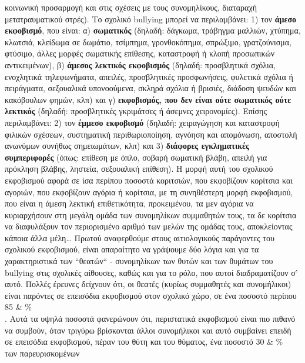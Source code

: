 \documentclass[12pt,a4paper]{book}
\begin{document}
κοινωνική προσαρμογή και στις σχέσεις με τους συνομηλίκους, διαταραχή
μετατραυματικού στρές).
\newline\setlength{\parindent}{20pt}\indent Το σχολικό bullying μπορεί να
περιλαμβάνει: 1) τον \textbf{άμεσο εκφοβισμό}, που είναι: α) \textbf{σωματικός}
(δηλαδή: δάγκωμα, τράβηγμα μαλλιών, χτύπημα, κλωτσιά, κλείδωμα σε δωμάτιο,
τσίμπημα, γρονθοκόπημα, σπρώξιμο, γρατζούνισμα, φτύσιμο, άλλες μορφές σωματικής
επίθεσης, καταστροφή ή κλοπή προσωπικών αντικειμένων), β) \textbf{άμεσος
λεκτικός εκφοβισμός} (δηλαδή: προσβλητικά σχόλια, ενοχλητικά τηλεφωνήματα,
απειλές, προσβλητικές προσφωνήσεις, φυλετικά σχόλια ή πειράγματα, σεξουαλικά
υπονοούμενα, σκληρά σχόλια ή βρισιές, διάδοση ψευδών και κακόβουλων φημών,
κλπ) και γ) \textbf{εκφοβισμός, που δεν είναι ούτε σωματικός ούτε λεκτικός}
(δηλαδή: προσβλητικές γκριμάτσες ή άσεμνες χειρονομίες). Επίσης περιλαμβάνει: 2)
τον \textbf{έμμεσο εκφοβισμό} (δηλαδή: χειραγώγηση και καταστροφή φιλικών
σχέσεων, συστηματική περιθωριοποίηση, αγνόηση και απομόνωση, αποστολή ανωνύμων
συνήθως σημειωμάτων, κλπ) και 3) \textbf{διάφορες εγκληματικές συμπεριφορές}
(όπως: επίθεση με όπλο, σοβαρή σωματική βλάβη, απειλή για πρόκληση βλάβης,
ληστεία, σεξουαλική επίθεση).
\newline\setlength{\parindent}{20pt}\indent Η μορφή αυτή του σχολικού εκφοβισμού
αφορά σε ίσα περίπου ποσοστά κοριτσιών, που εκφοβίζουν κορίτσια και αγοριών, που
εκφοβίζουν αγόρια ή κορίτσια, με τη συνηθέστερη μορφή εκφοβισμού, που είναι η
άμεση λεκτική επιθετικότητα, προκειμένου, τα μεν αγόρια να κυριαρχήσουν στη
μεγάλη ομάδα των συνομηλίκων συμμαθητών τους, τα δε κορίτσια να διαφυλάξουν
τον περιορισμένο αριθμό των μελών της ομάδας τους,  αποκλείοντας κάποια άλλα
μέλη\ldots
\newline\setlength{\parindent}{20pt}\indent Πρωτού αναφερθούμε στους
αιτιολογικούς παράγοντες του σχολικού εκφοβισμού, είναι απαραίτητο να γράψουμε
δύο λόγια και για τα χαρακτηριστικά των ``θεατών`` - συνομηλίκων των θυτών και
των θυμάτων του bullying στις σχολικές αίθουσες, καθώς και για το ρόλο, που
αυτοί διαδραματίζουν σ' αυτό. Πολλές έρευνες δείχνουν ότι, οι θεατές (κυρίως
συμμαθητές και συνομήλικοι) είναι παρόντες σε επεισόδια εκφοβισμού στον σχολικό
χώρο, σε ένα ποσοστό περίπου \num{85} & \% \\. Αυτά τα υψηλά ποσοστά φανερώνουν
ότι, περιστατικά εκφοβισμού είναι πιο πιθανό να συμβούν, όταν τριγύρω βρίσκονται
άλλοι συνομήλικοι  και αυτό συμβαίνει επειδή σε επεισόδια εκφοβισμού, πέραν του
θύτη και του θύματος, ένα ποσοστό \num{30} & \% \\ των παρευρισκομένων
\end{document}
